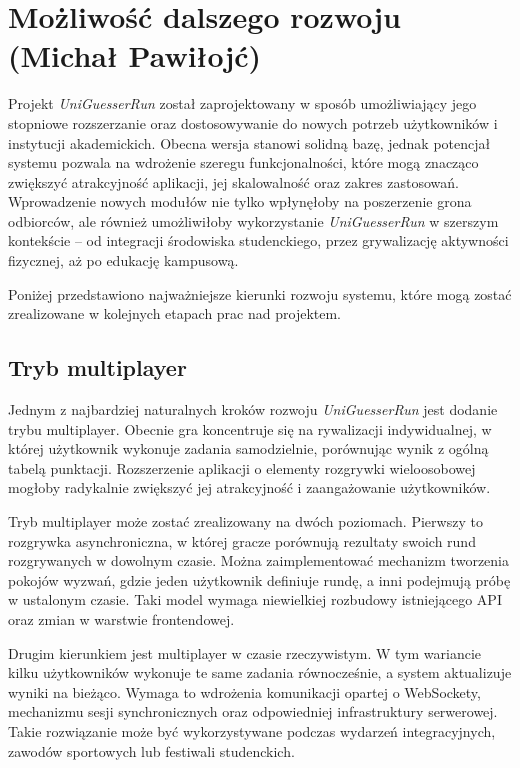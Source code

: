 \chapter{Możliwość dalszego rozwoju (Michał Pawiłojć)}
\label{chap:enhancements}

Projekt \textit{UniGuesserRun} został zaprojektowany w sposób umożliwiający jego stopniowe rozszerzanie oraz dostosowywanie do nowych potrzeb użytkowników i instytucji akademickich. Obecna wersja stanowi solidną bazę, jednak potencjał systemu pozwala na wdrożenie szeregu funkcjonalności, które mogą znacząco zwiększyć atrakcyjność aplikacji, jej skalowalność oraz zakres zastosowań. Wprowadzenie nowych modułów nie tylko wpłynęłoby na poszerzenie grona odbiorców, ale również umożliwiłoby wykorzystanie \textit{UniGuesserRun} w szerszym kontekście -- od integracji środowiska studenckiego, przez grywalizację aktywności fizycznej, aż po edukację kampusową.

Poniżej przedstawiono najważniejsze kierunki rozwoju systemu, które mogą zostać zrealizowane w kolejnych etapach prac nad projektem.

\section{Tryb multiplayer}

Jednym z najbardziej naturalnych kroków rozwoju \textit{UniGuesserRun} jest dodanie trybu multiplayer. Obecnie gra koncentruje się na rywalizacji indywidualnej, w której użytkownik wykonuje zadania samodzielnie, porównując wynik z ogólną tabelą punktacji. Rozszerzenie aplikacji o elementy rozgrywki wieloosobowej mogłoby radykalnie zwiększyć jej atrakcyjność i zaangażowanie użytkowników.

Tryb multiplayer może zostać zrealizowany na dwóch poziomach. Pierwszy to rozgrywka asynchroniczna, w której gracze porównują rezultaty swoich rund rozgrywanych w dowolnym czasie. Można zaimplementować mechanizm tworzenia pokojów wyzwań, gdzie jeden użytkownik definiuje rundę, a inni podejmują próbę w ustalonym czasie. Taki model wymaga niewielkiej rozbudowy istniejącego API oraz zmian w warstwie frontendowej.

Drugim kierunkiem jest multiplayer w czasie rzeczywistym. W tym wariancie kilku użytkowników wykonuje te same zadania równocześnie, a system aktualizuje wyniki na bieżąco. Wymaga to wdrożenia komunikacji opartej o WebSockety, mechanizmu sesji synchronicznych oraz odpowiedniej infrastruktury serwerowej. Takie rozwiązanie może być wykorzystywane podczas wydarzeń integracyjnych, zawodów sportowych lub festiwali studenckich.


